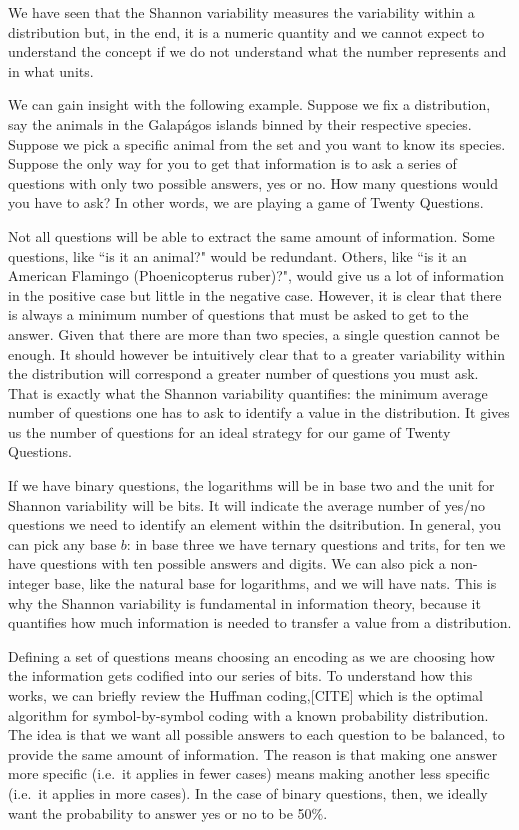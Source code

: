 \documentclass{article}
\begin{document}
We have seen that the Shannon variability measures the variability within a distribution but, in the end, it is a numeric quantity and we cannot expect to understand the concept if we do not understand what the number represents and in what units.

We can gain insight with the following example. Suppose we fix a distribution, say the animals in the Galap\'{a}gos islands binned by their respective species. Suppose we pick a specific animal from the set and you want to know its species. Suppose the only way for you to get that information is to ask a series of questions with only two possible answers, yes or no. How many questions would you have to ask? In other words, we are playing a game of Twenty Questions.

Not all questions will be able to extract the same amount of information. Some questions, like ``is it an animal?" would be redundant. Others, like ``is it an American Flamingo (Phoenicopterus ruber)?", would give us a lot of information in the positive case but little in the negative case. However, it is clear that there is always a minimum number of questions that must be asked to get to the answer. Given that there are more than two species, a single question cannot be enough. It should however be intuitively clear that to a greater variability within the distribution will correspond a greater number of questions you must ask. That is exactly what the Shannon variability quantifies: the minimum average number of questions one has to ask to identify a value in the distribution. It gives us the number of questions for an ideal strategy for our game of Twenty Questions.

If we have binary questions, the logarithms will be in base two and the unit for Shannon variability will be bits. It will indicate the average number of yes/no questions we need to identify an element within the dsitribution. In general, you can pick any base $b$: in base three we have ternary questions and trits, for ten we have questions with ten possible answers and digits. We can also pick a non-integer base, like the natural base for logarithms, and we will have nats. This is why the Shannon variability is fundamental in information theory, because it quantifies how much information is needed to transfer a value from a distribution.

Defining a set of questions means choosing an encoding as we are choosing how the information gets codified into our series of bits. To understand how this works, we can briefly review the Huffman coding,[CITE] which is the optimal algorithm for symbol-by-symbol coding with a known probability distribution. The idea is that we want all possible answers to each question to be balanced, to provide the same amount of information. The reason is that making one answer more specific (i.e.~it applies in fewer cases) means making another less specific (i.e.~it applies in more cases). In the case of binary questions, then, we ideally want the probability to answer yes or no to be 50\%.
\end{document}

